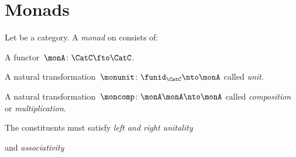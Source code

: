 

\section{Monads}
\label{sec:monads}

\begin{ctdefinition}[Monad]
  \label{def:monad}
  Let \CatC be a category. A \emph{monad} on \CatC consists of:
  \begin{compactenum}
    \item A functor~$ \monA \colon \CatC \fto \CatC$.
    \item A natural transformation~$\monunit \colon \funid_\CatC \nto \monA$ called \emph{unit}.
    \item A natural transformation~$\moncomp \colon \monA \monA \nto \monA$ called \emph{composition} or \emph{multiplication}.
  \end{compactenum}
  The constituents must satisfy \emph{left and right unitality}
  \begin{center}
  \end{center}
  and \emph{associativity}
  \begin{center}
  \end{center}
\end{ctdefinition}
